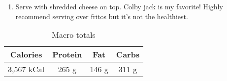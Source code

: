 \begin{multicols}{2}
\begin{enumerate}
\item Serve with shredded cheese on top. Colby jack is my favorite! Highly recommend serving over fritos but it's not the healthiest. 
\end{enumerate}

\begin{table}[H]
  \begin{center}
    \caption{Macro totals}
    \label{tab:table1}
    \begin{tabular}{c|c|c|c} %
      \textbf{Calories} & \textbf{Protein} & \textbf{Fat} & \textbf{Carbs}\\
      \hline
      3,567 kCal & 265 g & 146 g & 311 g\\
    \end{tabular}
  \end{center}
\end{table}
\end{multicols}
